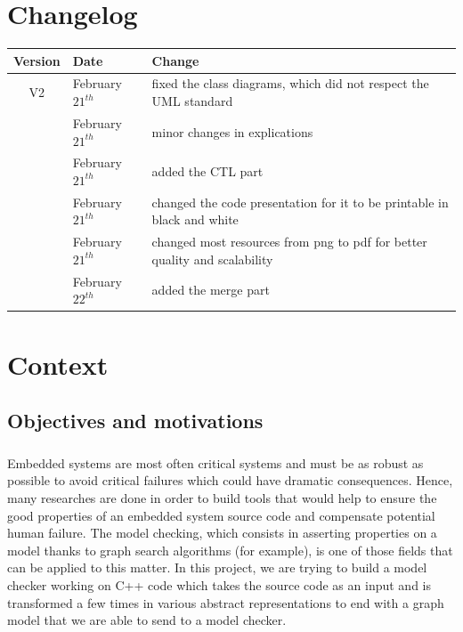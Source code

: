 \documentclass{report}
\begin{document}
\chapter*{Changelog}
\begin{center}
\begin{tabular}{|c|l|l|}
  \hline
  Version & Date & Change  \\
  \hline
  V2 & February $21^{th}$  & fixed the class diagrams, which did not respect the UML standard \\
  & February $21^{th}$ & minor changes in explications \\
  & February $21^{th}$ & added the CTL part \\
  & February $21^{th}$ & changed the code presentation for it to be printable in black and white \\
  & February $21^{th}$ & changed most resources from png to pdf for better quality and scalability \\
  & February $22^{th}$ & added the merge part \\
  \hline
\end{tabular}
\end{center}
\chapter{Context}

\section{Objectives and motivations}

\paragraph{}
\hspace{4mm}Embedded systems are most often critical systems and must be as robust as possible to avoid critical failures which could have dramatic consequences.
Hence, many researches are done in order to build tools that would help to ensure the good properties of an embedded system source code and compensate potential human
failure. The model checking, which consists in asserting properties on a model thanks to graph search algorithms (for example), is one of those fields that can be
applied to this matter. In this project, we are trying to build a model checker working on C++ code which takes the source code as an input and is transformed a few times
in various abstract representations to end with a graph model that we are able to send to a model checker.
\end{document}
